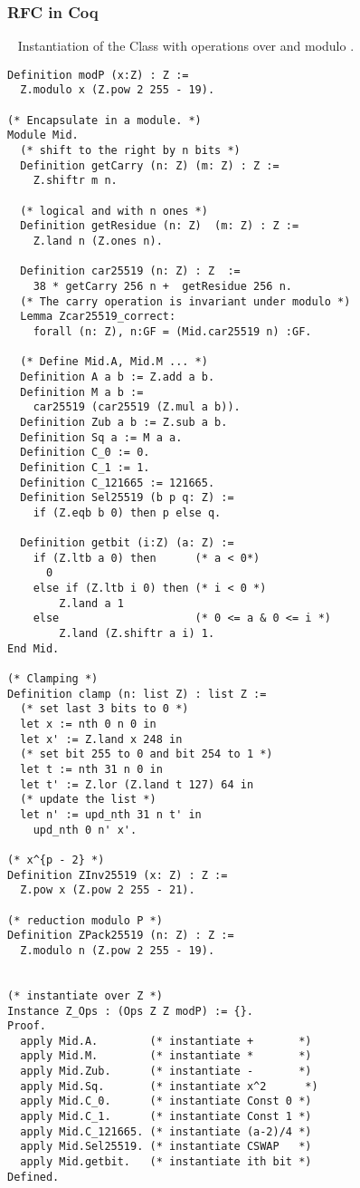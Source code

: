 \subsubsection{RFC in Coq}
\label{subsubsec:RFC-Coq}
~
Instantiation of the Class  with operations over \Z and modulo \p.
\begin{lstlisting}[language=Coq]
Definition modP (x:Z) : Z :=
  Z.modulo x (Z.pow 2 255 - 19).

(* Encapsulate in a module. *)
Module Mid.
  (* shift to the right by n bits *)
  Definition getCarry (n: Z) (m: Z) : Z :=
    Z.shiftr m n.

  (* logical and with n ones *)
  Definition getResidue (n: Z)  (m: Z) : Z :=
    Z.land n (Z.ones n).

  Definition car25519 (n: Z) : Z  :=
    38 * getCarry 256 n +  getResidue 256 n.
  (* The carry operation is invariant under modulo *)
  Lemma Zcar25519_correct:
    forall (n: Z), n:GF = (Mid.car25519 n) :GF.

  (* Define Mid.A, Mid.M ... *)
  Definition A a b := Z.add a b.
  Definition M a b :=
    car25519 (car25519 (Z.mul a b)).
  Definition Zub a b := Z.sub a b.
  Definition Sq a := M a a.
  Definition C_0 := 0.
  Definition C_1 := 1.
  Definition C_121665 := 121665.
  Definition Sel25519 (b p q: Z) :=
    if (Z.eqb b 0) then p else q.

  Definition getbit (i:Z) (a: Z) :=
    if (Z.ltb a 0) then      (* a < 0*)
      0
    else if (Z.ltb i 0) then (* i < 0 *)
        Z.land a 1
    else                     (* 0 <= a & 0 <= i *)
        Z.land (Z.shiftr a i) 1.
End Mid.

(* Clamping *)
Definition clamp (n: list Z) : list Z :=
  (* set last 3 bits to 0 *)
  let x := nth 0 n 0 in
  let x' := Z.land x 248 in
  (* set bit 255 to 0 and bit 254 to 1 *)
  let t := nth 31 n 0 in
  let t' := Z.lor (Z.land t 127) 64 in
  (* update the list *)
  let n' := upd_nth 31 n t' in
    upd_nth 0 n' x'.

(* x^{p - 2} *)
Definition ZInv25519 (x: Z) : Z :=
  Z.pow x (Z.pow 2 255 - 21).

(* reduction modulo P *)
Definition ZPack25519 (n: Z) : Z :=
  Z.modulo n (Z.pow 2 255 - 19).


(* instantiate over Z *)
Instance Z_Ops : (Ops Z Z modP) := {}.
Proof.
  apply Mid.A.        (* instantiate +       *)
  apply Mid.M.        (* instantiate *       *)
  apply Mid.Zub.      (* instantiate -       *)
  apply Mid.Sq.       (* instantiate x^2      *)
  apply Mid.C_0.      (* instantiate Const 0 *)
  apply Mid.C_1.      (* instantiate Const 1 *)
  apply Mid.C_121665. (* instantiate (a-2)/4 *)
  apply Mid.Sel25519. (* instantiate CSWAP   *)
  apply Mid.getbit.   (* instantiate ith bit *)
Defined.


\end{lstlisting}

